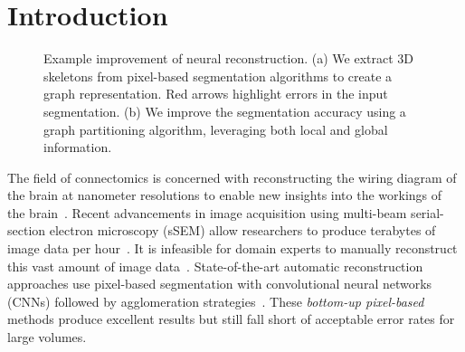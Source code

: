 \section{Introduction}

\begin{figure}[t]
	\caption{Example improvement of neural reconstruction. (a) We extract 3D skeletons from pixel-based segmentation algorithms to create a graph representation. Red arrows highlight errors in the input segmentation. (b) We improve the segmentation accuracy using a graph partitioning algorithm, leveraging both local and global information.}
	\label{fig:teaser}
\end{figure}

The field of connectomics is concerned with reconstructing the wiring diagram of the brain at nanometer resolutions to enable new insights into the workings of the brain~\cite{haehn2017scalable,kasthuri2015saturated}. 
Recent advancements in image acquisition using multi-beam serial-section electron microscopy (sSEM) allow researchers to produce terabytes of image data per hour~\cite{hildebrand2017whole}. 
It is infeasible for domain experts to manually reconstruct this vast amount of image data~\cite{haehn2014design}. 
State-of-the-art automatic reconstruction approaches use pixel-based segmentation with convolutional neural networks (CNNs) followed by agglomeration strategies~\cite{seymour2016rhoananet,lee2015recursive,nunez2014graph,parag2017anisotropic,ronneberger2015u,zlateski2015image}.
These \textit{bottom-up pixel-based} methods produce excellent results but still fall short of acceptable error rates for large volumes.


